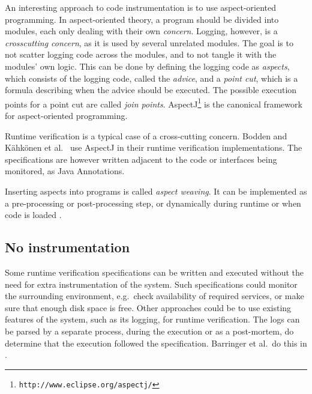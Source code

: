 An interesting approach to code instrumentation is to use aspect-oriented
programming. In aspect-oriented theory, a program should be divided into
modules, each only dealing with their own \textit{concern}. Logging, however,
is a \textit{crosscutting concern}, as it is used by several unrelated modules.
The goal is to not scatter logging code across the modules, and to not tangle
it with the modules' own logic. This can be done by defining the logging code
as \textit{aspects}, which consists of the logging code, called the
\textit{advice}, and a \textit{point cut}, which is a formula describing when
the advice should be executed. The possible execution points for a point cut
are called \textit{join points}.
AspectJ\footnote{\texttt{http://www.eclipse.org/aspectj/}} is the canonical
framework for aspect-oriented programming.

Runtime verification is a typical case of a cross-cutting concern. Bodden
\cite{bodden05efficientrv} and Kähkönen et al.\ \cite{kahkonen09lime} use
AspectJ in their runtime verification implementations. The specifications are
however written adjacent to the code or interfaces being monitored, as Java
Annotations.

Inserting aspects into programs is called \textit{aspect weaving}. It can be
implemented as a pre-processing or post-processing step, or dynamically during
runtime or when code is loaded \cite{kiczales01aspect, matusiak09aoppy}.


\subsection{No instrumentation}

Some runtime verification specifications can be written and executed without
the need for extra instrumentation of the system. Such specifications could
monitor the surrounding environment, e.g.\ check availability of required
services, or make sure that enough disk space is free. Other approaches could be
to use existing features of the system, such as its logging, for runtime
verification. The logs can be parsed by a separate process, during the
execution or as a post-mortem, do determine that the execution followed the
specification. Barringer et al.\ do this in \cite{barringer09tutorial}.

